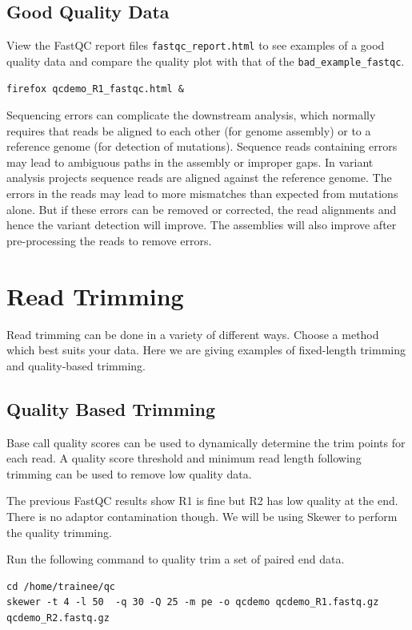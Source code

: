 \begin{bonus}
\subsection{Good Quality Data}
View the FastQC report files \texttt{fastqc\_report.html} to see examples of a good
quality data and compare the quality plot with that of the \texttt{bad\_example\_fastqc}.

\begin{lstlisting}
firefox qcdemo_R1_fastqc.html &
\end{lstlisting}
\end{bonus}

\begin{note}
Sequencing errors can complicate the downstream analysis, which normally
requires that reads be aligned to each other (for genome assembly) or to a
reference genome (for detection of mutations). Sequence reads containing errors
may lead to ambiguous paths in the assembly or improper gaps. In variant
analysis projects sequence reads are aligned against the reference genome. The
errors in the reads may lead to more mismatches than expected from
mutations alone. But if these errors can be removed or corrected, the read
alignments and hence the variant detection will improve. The assemblies will also
improve after pre-processing the reads to remove errors.
\end{note}

\section{Read Trimming}
Read trimming can be done in a variety of different ways. Choose a method
which best suits your data. Here we are giving examples of fixed-length trimming
and quality-based trimming.

\subsection{Quality Based Trimming}
Base call quality scores can be used to dynamically determine the trim
points for each read. A quality score threshold and minimum read length
following trimming can be used to remove low quality data.


\begin{steps}

The previous FastQC results show R1 is fine but R2 has low quality at the end. There is no adaptor contamination though.
We will be using Skewer to perform the quality trimming.

Run the following command to quality trim a set of paired end data.
\begin{lstlisting}
cd /home/trainee/qc
skewer -t 4 -l 50  -q 30 -Q 25 -m pe -o qcdemo qcdemo_R1.fastq.gz qcdemo_R2.fastq.gz
\end{lstlisting}
\end{steps}



